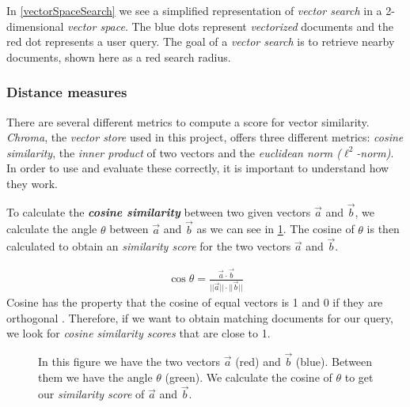 \documentclass{article}
\begin{document}
In \cref{vectorSpaceSearch} we see a simplified representation of \textit{vector search} in a 2-dimensional \textit{vector space}. The blue dots represent \textit{vectorized} documents and the red dot represents a user query. The goal of a \textit{vector search} is to retrieve nearby documents, shown here as a red search radius.

\subsubsection*{Distance measures}
There are several different metrics to compute a score for vector similarity. \textit{Chroma}, the \textit{vector store} used in this project, offers three different metrics: \textit{cosine similarity}, the \textit{inner product} of two vectors and the \textit{euclidean norm ($\ell^{2}$-norm)}. In order to use and evaluate these correctly, it is important to understand how they work.

To calculate the \textit{\textbf{cosine similarity}} between two given vectors $\vec{a}$ and $\vec{b}$, we calculate the angle $\theta$ between $\vec{a}$ and $\vec{b}$ as we can see in \cref{cosineSimilarityFigure}. The cosine of $\theta$ is then calculated to obtain an \textit{similarity score} for the two vectors $\vec{a}$ and $\vec{b}$.

\begin{align}
	 \cos{\theta} = \frac{\vec{a} \cdot \vec{b}}
  {||\vec{a}|| \cdot ||\vec{b}||}
\end{align}
Cosine has the property that the cosine of equal vectors is 1 and 0 if they are orthogonal \cite{SimilaritiesVectorSpaceModel}. Therefore, if we want to obtain matching documents for our query, we look for \textit{cosine similarity scores }that are close to 1.

\begin{figure}[H]
    \centering
{}
\caption{In this figure we have the two vectors $\vec{a}$ (red) and $\vec{b}$ (blue). Between them we have the angle $\theta$ (green). We calculate the cosine of $\theta$ to get our \textit{similarity score} of $\vec{a}$ and $\vec{b}$.}
\label{cosineSimilarityFigure}
\end{figure}
\end{document}
